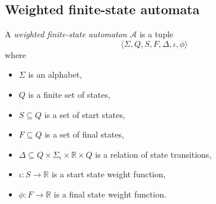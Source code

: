 \subsection{Weighted finite-state automata}

\begin{definition}
	A \emph{weighted finite-state automaton} $\mathcal{A}$ is a tuple
	\begin{equation*}
	\langle \Sigma, Q, S, F, \Delta, \iota, \phi \rangle
	\end{equation*}
	where
	\begin{itemize}
	\item $\Sigma$ is an alphabet,
	\item $Q$ is a finite set of states,
	\item $S \subseteq Q$ is a set of start states,
	\item $F \subseteq Q$ is a set of final states,
	\item $\Delta \subseteq Q \times \Sigma_\epsilon \times \mathbb{R} \times Q$
		is a relation of state transitions,
	\item $\iota : S \rightarrow \mathbb{R}$ is a start state weight function,
	\item $\phi : F \rightarrow \mathbb{R}$ is a final state weight function.
	\end{itemize}
\end{definition}
